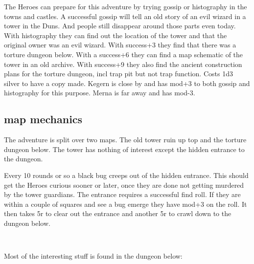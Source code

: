 The Heroes can prepare for this adventure by trying gossip or histography in the towns and castles. A successful gossip will tell an old story of an evil wizard in a tower in the Duns. And people still disappear around those parts even today. With histography they can find out the location of the tower and that the original owner was an evil wizard. With success+3 they find that there was a torture dungeon below. With a success+6 they can find a map schematic of the tower in an old archive. With success+9 they also find the ancient construction plans for the torture dungeon, incl trap pit but not trap function. Costs 1d3 silver to have a copy made. Kegern is close by and has mod+3 to both gossip and histography for this purpose. Merna is far away and has mod-3.


\subsection*{map mechanics}

The adventure is split over two maps. The old tower ruin up top and the torture dungeon below. The tower has nothing of interest except the hidden entrance to the dungeon. 

Every 10 rounds or so a black bug creeps out of the hidden entrance. This should get the Heroes curious sooner or later, once they are done not getting murdered by the tower guardians. The entrance requires a successful find roll. If they are within a couple of squares and see a bug emerge they have mod+3 on the roll. It then takes 5r to clear out the entrance and another 5r to crawl down to the dungeon below.

\

\noindent Most of the interesting stuff is found in the dungeon below:

